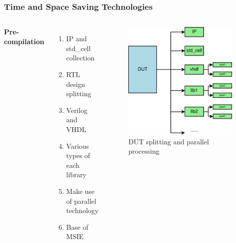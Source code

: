 \documentclass{beamer}
\begin{document}
\begin{frame}
  \frametitle{Time and Space Saving Technologies}
  \begin{columns}[c] %

    \textbf{Pre-compilation}
    \begin{enumerate}
    \item IP and std\_cell collection
    \item RTL design splitting
    \item Verilog and VHDL
    \item Various types of each library
    \item Make use of parallel technology
    \item Base of MSIE
    \end{enumerate}

    \begin{figure}
      \centering
      \includegraphics[width=0.9\linewidth]{dut_split}
      \caption{DUT splitting and parallel processing}
    \end{figure}

  \end{columns}
\end{frame}
\end{document}

